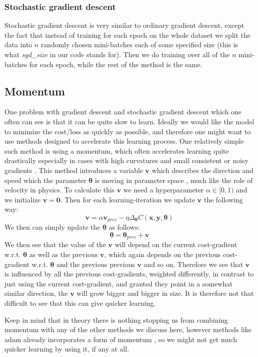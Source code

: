 \documentclass{article}
\begin{document}
\subsubsection{Stochastic gradient descent}
Stochastic gradient descent is very similar to ordinary gradient descent, except
the fact that instead of training for each epoch on the whole dataset we split
the data into $n$ randomly chosen mini-batches each of some specified size (this
is what \textit{sgd\_size} in our code stands for). Then we do training over all
of the $n$ mini-batches for each epoch, while the rest of the method is the same.

\subsection{Momentum}
One problem with gradient descent and stochastic gradient descent which one
often can see is that it can be quite slow to learn. Ideally we would like the
model to minimize the cost/loss as quickly as possible, and therefore one might
want to use methods designed to accelerate this learning process. One relatively
simple such method is using a momentum, which often accelerates learning quite
drastically especially in cases with high curvatures and small consistent or
noisy gradients \cite[s.~8.3.2]{goodfellow2016deep}. This method introduces a
variable $\bm{v}$ which describes the direction and speed which the parameter
$\bm{\theta}$ is moving in parameter space \cite[s.~8.3.2]{goodfellow2016deep}, much
like the role of velocity in physics. To calculate this $\bm{v}$ we need a
hyperparameter $\alpha \in [0, 1)$ and we initialize $\bm{v} = \bm{0}$. Then for
each learning-iteration we update $\bm{v}$ the following way:
$$\bm{v} = \alpha \bm{v}_{prev} - \eta \Delta_{\bm{\theta}} C(\bm{x}, \bm{y}, \bm{\theta})$$
We then can simply update the $\bm{\theta}$ as follows:
$$\bm{\theta} = \bm{\theta}_{prev} + \bm{v}$$
We then see that the value of the $\bm{v}$ will depend on the current cost-gradient
w.r.t. $\bm{\theta}$ as well as the previous $\bm{v}$, which again depends on
the previous cost-gradient w.r.t. $\bm{\theta}$ and the previous previous
$\bm{v}$ and so on. Therefore we see that $\bm{v}$ is influenced by all the
previous cost-gradients, weighted differently, in contrast to just using the
current cost-gradient, and granted they point in a somewhat similar direction,
the $\bm{v}$ will grow bigger and bigger in size. It is therefore not that
difficult to see that this can give quicker learning.


Keep in mind that in theory there is nothing stopping us from combining momentum
with any of the other methods we discuss here, however methods like adam already
incorporates a form of momentum \cite[s.~8.5.3]{goodfellow2016deep}, so we might
not get much quicker learning by using it, if any at all.
\end{document}
